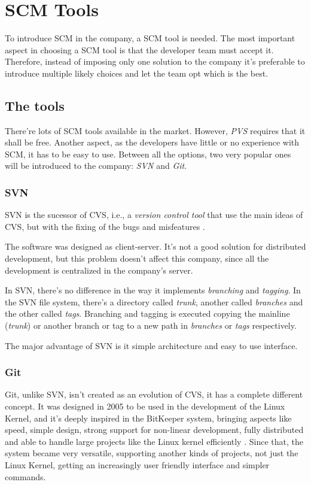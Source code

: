 \documentclass[a4paper]{article}
\begin{document}
\section{SCM Tools}

To introduce SCM in the company, a SCM tool is needed.
The most important aspect in choosing a SCM tool is that the developer team must accept it.
Therefore, instead of imposing only one solution to the company it's preferable to introduce multiple likely choices and let the team opt which is the best.

\subsection{The tools}

There're lots of SCM tools available in the market. However, \emph{PVS} requires that it shall be free.
Another aspect, as the developers have little or no experience with SCM, it has to be easy to use.
Between all the options, two very popular ones will be introduced to the company: \emph{SVN} and \emph{Git}.

\subsubsection{SVN}

SVN is the sucessor of CVS, i.e., a \emph{version control tool} that use the main ideas of CVS, but with the fixing of the bugs and misfeatures \cite{collins-sussman}.

The software was designed as client-server.
It's not a good solution for distributed development, but this problem doesn't affect this company, since all the development is centralized in the company's server.

In SVN, there's no difference in the way it implements \emph{branching} and \emph{tagging}.
In the SVN file system, there's a directory called \emph{trunk}, another called \emph{branches} and the other called \emph{tags}.
Branching and tagging is executed copying the mainline (\emph{trunk}) or another branch or tag to a new path in \emph{branches} or \emph{tags} respectively.

The major advantage of SVN is it simple architecture and easy to use interface.

\subsubsection{Git}

Git, unlike SVN, isn't created as an evolution of CVS, it has a complete different concept.
It was designed in 2005 to be used in the development of the Linux Kernel, and it's deeply inspired in the BitKeeper system, bringing aspects like speed, simple design, strong support for non-linear development, fully distributed and able to handle large projects like the Linux kernel efficiently \cite{chacon}.
Since that, the system became very versatile, supporting another kinds of projects, not just the Linux Kernel, getting an increasingly user friendly interface and simpler commands.
\end{document}
